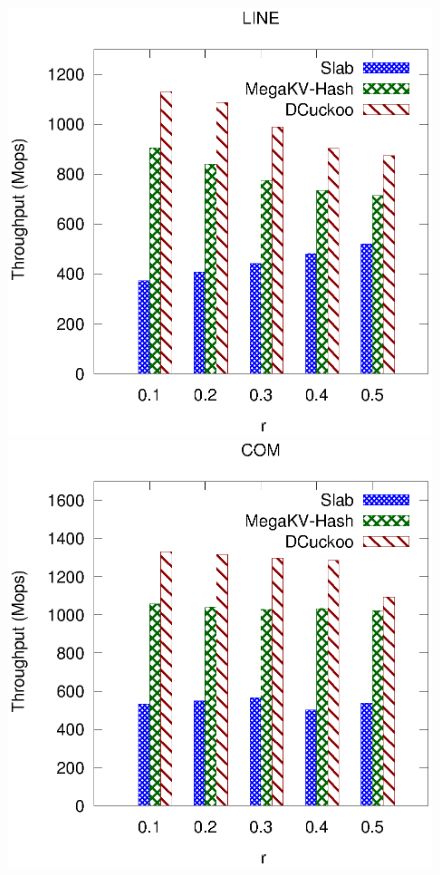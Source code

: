 \begin{figure}[htp]
\begin{minipage}{0.19\linewidth}
		\centerline{\dsreddit}
	\end{minipage}
	\begin{minipage}{0.19\linewidth}\centering
		\includegraphics[width=\linewidth]{pic/dynamic/r/dynamic_tpch.eps}
		\centerline{\dstpch}
	\end{minipage}
	\begin{minipage}{0.19\linewidth}\centering
		\includegraphics[width=\linewidth]{pic/dynamic/r/dynamic_ali.eps}

\end{minipage}
\end{figure}
